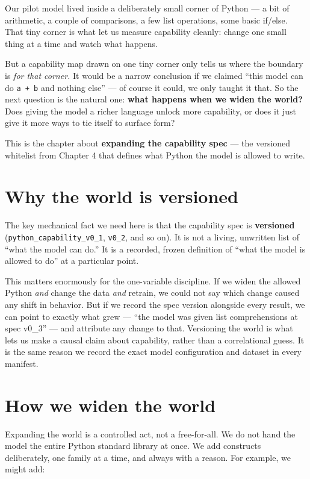 Our pilot model lived inside a deliberately small corner of Python --- a
bit of arithmetic, a couple of comparisons, a few list operations, some
basic if/else. That tiny corner is what let us measure capability
cleanly: change one small thing at a time and watch what happens.

But a capability map drawn on one tiny corner only tells us where the
boundary is \emph{for that corner.} It would be a narrow conclusion if
we claimed ``this model can do \texttt{a\ +\ b} and nothing else'' ---
of course it could, we only taught it that. So the next question is the
natural one: \textbf{what happens when we widen the world?} Does giving
the model a richer language unlock more capability, or does it just give
it more ways to tie itself to surface form?

This is the chapter about \textbf{expanding the capability spec} --- the
versioned whitelist from Chapter 4 that defines what Python the model is
allowed to write.

\section{Why the world is versioned}\label{why-the-world-is-versioned}

The key mechanical fact we need here is that the capability spec is
\textbf{versioned} (\texttt{python\_capability\_v0\_1}, \texttt{v0\_2},
and so on). It is not a living, unwritten list of ``what the model can
do.'' It is a recorded, frozen definition of ``what the model is allowed
to do'' at a particular point.

This matters enormously for the one-variable discipline. If we widen the
allowed Python \emph{and} change the data \emph{and} retrain, we could
not say which change caused any shift in behavior. But if we record the
spec version alongside every result, we can point to exactly what grew
--- ``the model was given list comprehensions at spec v0\_3'' --- and
attribute any change to that. Versioning the world is what lets us make
a causal claim about capability, rather than a correlational guess. It
is the same reason we record the exact model configuration and dataset
in every manifest.

\section{How we widen the world}\label{how-we-widen-the-world}

Expanding the world is a controlled act, not a free-for-all. We do not
hand the model the entire Python standard library at once. We add
constructs deliberately, one family at a time, and always with a reason.
For example, we might add:


